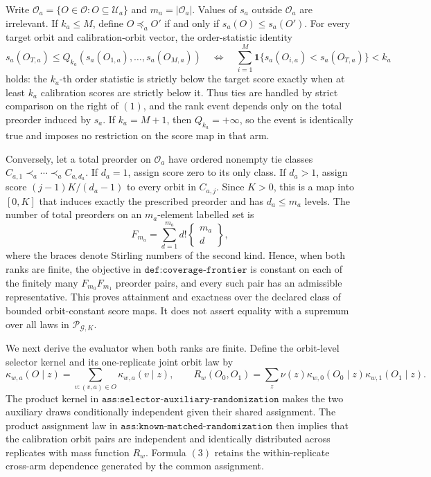 Write \(\mathcal O_a=\{O\in\mathcal O:O\subseteq\mathcal U_a\}\) and \(m_a=|\mathcal O_a|\). Values of \(s_a\) outside \(\mathcal O_a\) are irrelevant. If \(k_a\le M\), define \(O\preceq_a O'\) if and only if \(s_a(O)\le s_a(O')\). For every target orbit and calibration-orbit vector, the order-statistic identity
\[
s_a(O_{T,a})\le Q_{k_a}(s_a(O_{1,a}),\ldots,s_a(O_{M,a}))
\quad\Longleftrightarrow\quad
\sum_{i=1}^M\mathbf 1\{s_a(O_{i,a})<s_a(O_{T,a})\}<k_a
\tag{1}
\]
holds: the \(k_a\)-th order statistic is strictly below the target score exactly when at least \(k_a\) calibration scores are strictly below it. Thus ties are handled by strict comparison on the right of \((1)\), and the rank event depends only on the total preorder induced by \(s_a\). If \(k_a=M+1\), then \(Q_{k_a}=+\infty\), so the event is identically true and imposes no restriction on the score map in that arm.

Conversely, let a total preorder on \(\mathcal O_a\) have ordered nonempty tie classes \(C_{a,1}\prec_a\cdots\prec_a C_{a,d_a}\). If \(d_a=1\), assign score zero to its only class. If \(d_a>1\), assign score \((j-1)K/(d_a-1)\) to every orbit in \(C_{a,j}\). Since \(K>0\), this is a map into \([0,K]\) that induces exactly the prescribed preorder and has \(d_a\le m_a\) levels. The number of total preorders on an \(m_a\)-element labelled set is
\[
F_{m_a}=\sum_{d=1}^{m_a}d!\left\{\begin{matrix}m_a\\ d\end{matrix}\right\},
\tag{2}
\]
where the braces denote Stirling numbers of the second kind. Hence, when both ranks are finite, the objective in \(\texttt{def:coverage-frontier}\) is constant on each of the finitely many \(F_{m_0}F_{m_1}\) preorder pairs, and every such pair has an admissible representative. This proves attainment and exactness over the declared class of bounded orbit-constant score maps. It does not assert equality with a supremum over all laws in \(\mathcal P_{\mathcal G,K}\).

We next derive the evaluator when both ranks are finite. Define the orbit-level selector kernel and its one-replicate joint orbit law by
\[
\kappa_{w,a}(O\mid z)=\sum_{v:(v,a)\in O}\kappa_{w,a}(v\mid z),
\qquad
R_w(O_0,O_1)=\sum_z\nu(z)\kappa_{w,0}(O_0\mid z)\kappa_{w,1}(O_1\mid z).
\tag{3}
\]
The product kernel in \(\texttt{ass:selector-auxiliary-randomization}\) makes the two auxiliary draws conditionally independent given their shared assignment. The product assignment law in \(\texttt{ass:known-matched-randomization}\) then implies that the calibration orbit pairs are independent and identically distributed across replicates with mass function \(R_w\). Formula \((3)\) retains the within-replicate cross-arm dependence generated by the common assignment.

